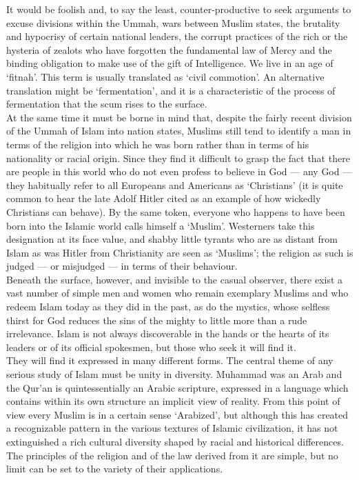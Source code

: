 \documentclass[10pt, twoside]{book}
\begin{document}
It would be foolish and, to say the least, counter\hyp{}productive to seek arguments to excuse divisions within the Ummah, wars between Muslim states, the brutality and hypocrisy of certain national leaders, the corrupt practices of the rich or the hysteria of zealots who have forgotten the fundamental law of Mercy and the binding obligation to make use of the gift of Intelligence. We live in an age of `fitnah'. This term is usually translated as `civil commotion'. An alternative translation might be `fermentation', and it is a characteristic of the process of fermentation that the scum rises to the surface. \\

At the same time it must be borne in mind that, despite the fairly recent division of the Ummah of Islam into nation states, Muslims still tend to identify a man in terms of the religion into which he was born rather than in terms of his nationality or racial origin. Since they find it difficult to grasp the fact that there are people in this world who do not even profess to believe in God --- any God --- they habitually refer to all Europeans and Americans as `Christians' (it is quite common to hear the late Adolf Hitler cited as an example of how wickedly Christians can behave). By the same token, everyone who happens to have been born into the Islamic world calls himself a `Muslim'. Westerners take this designation at its face value, and shabby little tyrants who are as distant from Islam as was Hitler from Christianity are seen as `Muslims'; the religion as such is judged --- or misjudged --- in terms of their behaviour. \\

Beneath the surface, however, and invisible to the casual observer, there exist a vast number of simple men and women who remain exemplary Muslims and who redeem Islam today as they did in the past, as do the mystics, whose selfless thirst for God reduces the sins of the mighty to little more than a rude irrelevance. Islam is not always discoverable in the hands or the hearts of its leaders or of its official spokesmen, but those who seek it will find it. \\

They will find it expressed in many different forms. The central theme of any serious study of Islam must be unity in diversity. Muhammad was an Arab and the Qur'an is quintessentially an Arabic scripture, expressed in a language which contains within its own structure an implicit view of reality. From this point of view every Muslim is in a certain sense `Arabized', but although this has created a recognizable pattern in the various textures of Islamic civilization, it has not extinguished a rich cultural diversity shaped by racial and historical differences. The principles of the religion and of the law derived from it are simple, but no limit can be set to the variety of their applications. \\
\end{document}
